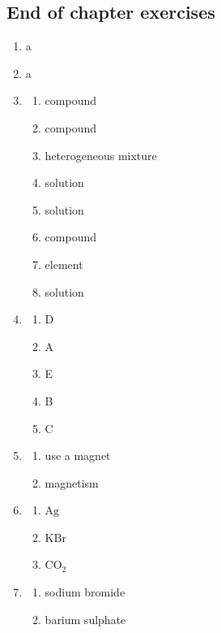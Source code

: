 \subsection{End of chapter exercises} 
\begin{multicols}{3} 
\begin{enumerate}[itemsep=5pt, label=\textbf{\arabic*}. ] 
\item a
\item a
\item %
\begin{enumerate}[itemsep=6pt,label=\textbf{(\alph*)}]
\item compound
\item compound
\item heterogeneous mixture
\item solution
\item solution
\item compound
\item element
\item solution
\end{enumerate}
\item %
\begin{enumerate}[itemsep=5pt,label=\textbf{(\alph*)}]
\item D  
\item A
\item E
\item B
\item C
\end{enumerate}
\item %
\begin{enumerate}[itemsep=5pt,label=\textbf{(\alph*)}]
\item use a magnet
\item magnetism
\end{enumerate}
\item %
\begin{enumerate}[itemsep=5pt,label=\textbf{(\alph*)}]
 \item $\text{Ag}$
 \item $\text{KBr}$
 \item $\text{CO}_{2}$
\end{enumerate}
\item %
\begin{enumerate}[itemsep=5pt,label=\textbf{(\alph*)}]
 \item sodium bromide
 \item barium sulphate

\end{enumerate}
\end{enumerate}
\end{multicols}

